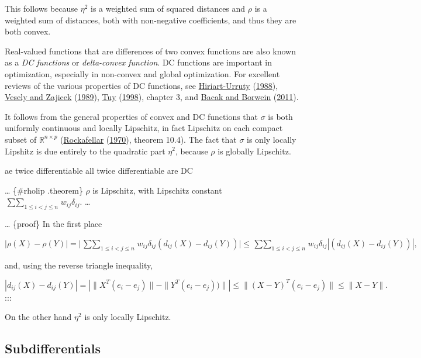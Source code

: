 \documentclass[
  12pt,
]{book}
\theoremstyle{definition}
\theoremstyle{definition}
\theoremstyle{definition}
\theoremstyle{definition}
\theoremstyle{remark}
\begin{document}
This follows because \(\eta^2\) is a weighted sum of squared distances and \(\rho\) is a weighted sum of distances, both with non-negative coefficients, and thus they are both convex.

Real-valued functions that are differences of two convex functions are also known as a \emph{DC functions} or \emph{delta-convex function}. DC functions are important in optimization, especially in non-convex and global optimization. For excellent reviews of the various properties of DC functions, see \protect\hyperlink{ref-hiriart-urruty_88}{Hiriart-Urruty} (\protect\hyperlink{ref-hiriart-urruty_88}{1988}), \protect\hyperlink{ref-vesely_zajicek_89}{Vesely and Zajicek} (\protect\hyperlink{ref-vesely_zajicek_89}{1989}), \protect\hyperlink{ref-tuy_98}{Tuy} (\protect\hyperlink{ref-tuy_98}{1998}), chapter 3, and \protect\hyperlink{ref-bacak_borwein_11}{Bacak and Borwein} (\protect\hyperlink{ref-bacak_borwein_11}{2011}).

It follows from the general properties of convex and DC functions that \(\sigma\) is both uniformly continuous and locally Lipschitz, in fact Lipschitz on each compact subset of \(\mathbb{R}^{n\times p}\) (\protect\hyperlink{ref-rockafellar_70}{Rockafellar} (\protect\hyperlink{ref-rockafellar_70}{1970}), theorem 10.4). The fact that \(\sigma\) is only locally Lipshitz is due entirely to the quadratic part \(\eta^2\), because \(\rho\) is globally Lipschitz.

ae twice differentiable
all twice differentiable are DC

\ldots{} \{\#rholip .theorem\}
\(\rho\) is Lipschitz, with Lipschitz constant \(\mathop{\sum\sum}_{1\leq i<j\leq n}w_{ij}\delta_{ij}\).
\ldots{}

\ldots{} \{proof\}
In the first place

\[
|\rho(X)-\rho(Y)|=
\mid\mathop{\sum\sum}_{1\leq i<j\leq n}w_{ij}\delta_{ij}(d_{ij}(X)-d_{ij}(Y))\mid\leq
\mathop{\sum\sum}_{1\leq i<j\leq n}w_{ij}\delta_{ij}|(d_{ij}(X)-d_{ij}(Y))|,
\]

and, using the reverse triangle inequality,

\[
|d_{ij}(X)-d_{ij}(Y)|=|\|X^T(e_i-e_j)\|-\|Y^T(e_i-e_j))\||\leq\|(X-Y)^T(e_i-e_j)\|\leq\|X-Y\|.
\]
:::

On the other hand \(\eta^2\) is only locally Lipschitz.

\hypertarget{subdifferentials}{%
\subsection{Subdifferentials}\label{subdifferentials}}
\end{document}
